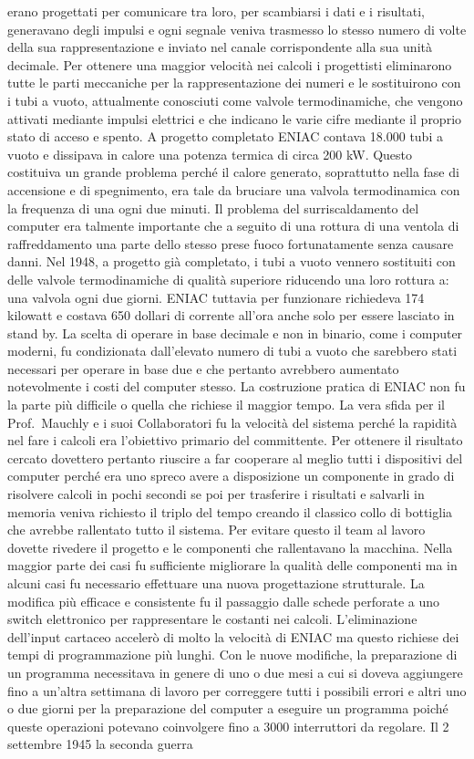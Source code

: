 erano progettati per comunicare tra loro, per scambiarsi i dati e i risultati, generavano degli impulsi e ogni segnale veniva trasmesso lo stesso numero di volte della sua rappresentazione e inviato nel canale corrispondente alla sua unità decimale.  Per ottenere una maggior velocità nei calcoli i progettisti eliminarono tutte le parti meccaniche per la rappresentazione dei numeri e le sostituirono con i tubi a vuoto, attualmente conosciuti come valvole termodinamiche, che vengono attivati mediante impulsi elettrici e che indicano le varie cifre mediante il proprio stato di acceso e spento.  A progetto completato ENIAC contava 18.000 tubi a vuoto e dissipava in calore una potenza termica di circa 200 kW. Questo costituiva un grande problema perché il calore generato, soprattutto nella fase di accensione e di spegnimento, era tale da bruciare una valvola termodinamica con la frequenza di una ogni due minuti. Il problema del surriscaldamento del computer era talmente importante che a seguito di una rottura di una ventola di raffreddamento una parte dello stesso prese fuoco fortunatamente senza causare danni. Nel 1948, a progetto già completato, i tubi a vuoto vennero sostituiti con delle valvole termodinamiche di qualità superiore riducendo una loro rottura a: una valvola ogni due giorni. ENIAC tuttavia per funzionare richiedeva 174 kilowatt e costava 650 dollari di corrente all’ora anche solo per essere lasciato in stand by. La scelta di operare in base decimale e non in binario, come i computer moderni, fu condizionata dall’elevato numero di tubi a vuoto che sarebbero stati necessari per operare in base due e che pertanto avrebbero aumentato notevolmente i costi del computer stesso. La costruzione pratica di ENIAC non fu la parte più difficile o quella che richiese il maggior tempo. La vera sfida per il Prof.\ Mauchly e i suoi Collaboratori fu la velocità del sistema perché la rapidità nel fare i calcoli era l’obiettivo primario del committente. Per ottenere il risultato cercato dovettero pertanto riuscire a far cooperare al meglio tutti i dispositivi del computer perché era uno spreco avere a disposizione un componente in grado di risolvere calcoli in pochi secondi se poi per trasferire i risultati e salvarli in memoria veniva richiesto il triplo del tempo creando il classico collo di bottiglia che avrebbe rallentato tutto il sistema. Per evitare questo il team al lavoro dovette rivedere il progetto e le componenti che rallentavano la macchina. Nella maggior parte dei casi fu sufficiente migliorare la qualità delle componenti ma in alcuni casi fu necessario effettuare una nuova progettazione strutturale.  La modifica più efficace e consistente fu il passaggio dalle schede perforate a uno switch elettronico per rappresentare le costanti nei calcoli. L’eliminazione dell’input cartaceo accelerò di molto la velocità di ENIAC ma questo richiese dei tempi di programmazione più lunghi. Con le nuove modifiche, la preparazione di un programma necessitava in genere di uno o due mesi a cui si doveva aggiungere fino a un’altra settimana di lavoro per correggere tutti i possibili errori e altri uno o due giorni per la preparazione del computer a eseguire un programma poiché queste operazioni potevano coinvolgere fino a 3000 interruttori da regolare. Il 2 settembre 1945 la seconda guerra 